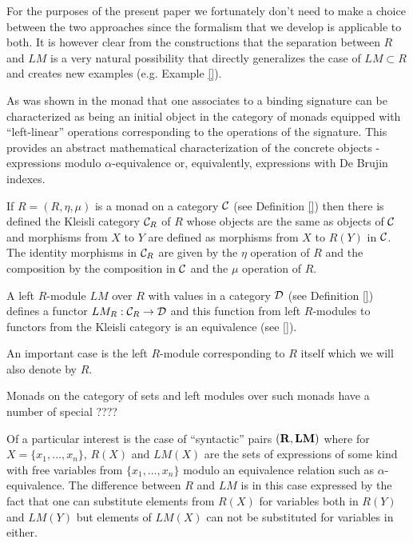 \documentclass[11pt]{article}
\newcommand{\sr}{\rightarrow}
\newcommand{\rr}{{\bf R}}
\newcommand{\lm}{{\bf LM}}
\begin{document}
For the purposes of the present paper we fortunately don't need to make a choice between the two approaches since the formalism that we develop is applicable to both. It is however clear from the constructions that the separation between $R$ and $LM$ is a very natural possibility that directly generalizes the case of $LM\subset R$ and creates new examples (e.g. Example \ref{}). 

As was shown in \cite{HM2007} the monad that one associates to a binding signature can be characterized as being an initial object in the category of monads equipped with ``left-linear'' operations corresponding to the operations of the signature.  This provides an abstract mathematical characterization of the concrete objects - expressions modulo $\alpha$-equivalence or, equivalently, expressions with De Brujin indexes. 








If $R=(R,\eta,\mu)$ is a monad on a category $\cal C$ (see Definition \ref{}) then there is defined the Kleisli category ${\cal C}_R$ of $R$ whose objects are the same as objects of $\cal C$ and morphisms from $X$ to $Y$ are defined as morphisms from $X$ to $R(Y)$ in $\cal C$. The identity morphisms in ${\cal C}_R$ are given by the $\eta$ operation of $R$ and the composition by the composition in $\cal C$ and the $\mu$ operation of $R$.

A left $R$-module $LM$  over $R$ with values in a category $\cal D$ (see Definition \ref{}) defines a functor $LM_R:{\cal C}_R\sr {\cal D}$ and this function from left $R$-modules to functors from the Kleisli category is an equivalence (see \ref{}). 

An important case is the left $R$-module corresponding to $R$ itself which we will also denote by $R$.   

Monads on the category of sets and left modules over such monads have a number of special ????


Of a particular interest is the case of ``syntactic'' pairs $(\rr,\lm)$ where for $X=\{x_1,\dots,x_n\}$, $R(X)$ and $LM(X)$ are the sets of expressions of some kind with free variables from $\{x_1,\dots,x_n\}$ modulo an equivalence relation such as $\alpha$-equivalence. The difference between $R$ and $LM$ is in this case expressed by the fact that one can substitute elements from $R(X)$ for variables both in $R(Y)$ and $LM(Y)$ but elements of $LM(X)$ can not be substituted for variables in either. 
\end{document}

